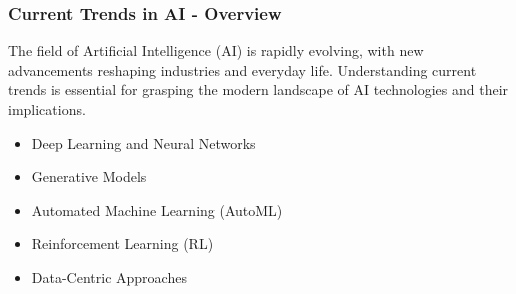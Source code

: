 \documentclass[aspectratio=169]{beamer}
\begin{document}
\begin{frame}[fragile]
    \frametitle{Current Trends in AI - Overview}
    The field of Artificial Intelligence (AI) is rapidly evolving, with new advancements reshaping industries and everyday life. Understanding current trends is essential for grasping the modern landscape of AI technologies and their implications.
    
    \begin{itemize}
        \item Deep Learning and Neural Networks
        \item Generative Models
        \item Automated Machine Learning (AutoML)
        \item Reinforcement Learning (RL)
        \item Data-Centric Approaches
    \end{itemize}
\end{frame}
\end{document}
